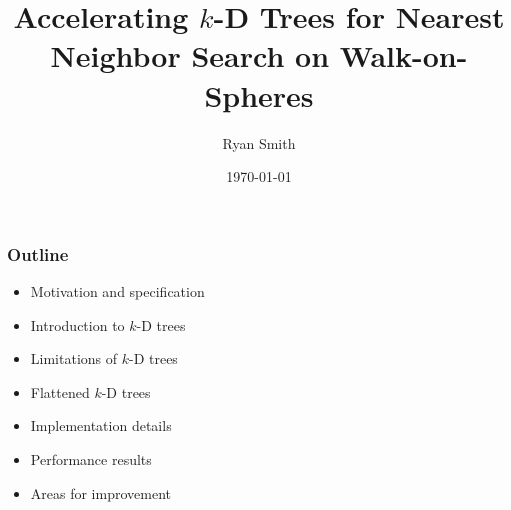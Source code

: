 \documentclass[lualatex,aspectratio=169]{beamer}
\title{Accelerating $k$-D Trees for Nearest Neighbor Search on Walk-on-Spheres}
\date[\today]{\today}
\author[Ryan Smith]{Ryan Smith}
\newcommand{\kd}{$k$-D\xspace}
\begin{document}
\begin{frame}
  \titlepage
\end{frame}

\begin{frame} 

  \frametitle{Outline} 

  \begin{itemize} 
    \item Motivation and specification
    \item Introduction to \kd trees
    \item Limitations of \kd trees
    \item Flattened \kd trees
    \item Implementation details
    \item Performance results
    \item Areas for improvement
  \end{itemize}

\end{frame}




\end{document}
